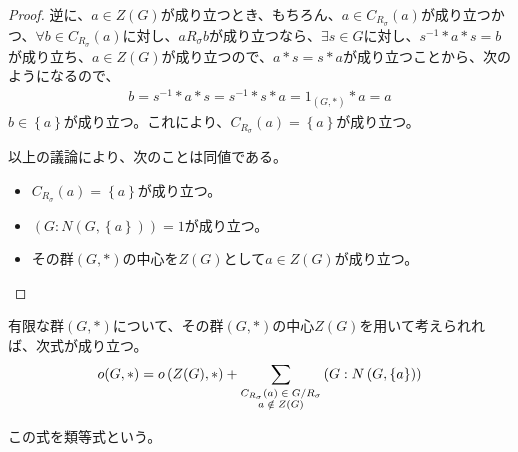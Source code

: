 \documentclass[dvipdfmx]{jsarticle}
\begin{document}
\begin{proof}
逆に、$a \in Z(G)$が成り立つとき、もちろん、$a \in C_{R_{\sigma}}(a)$が成り立つかつ、$\forall b \in C_{R_{\sigma}}(a)$に対し、$aR_{\sigma}b$が成り立つなら、$\exists s \in G$に対し、$s^{- 1}*a*s = b$が成り立ち、$a \in Z(G)$が成り立つので、$a*s = s*a$が成り立つことから、次のようになるので、
\begin{align*}
b = s^{- 1}*a*s = s^{- 1}*s*a = 1_{(G,*)}*a = a
\end{align*}
$b \in \left\{ a \right\}$が成り立つ。これにより、$C_{R_{\sigma}}(a) = \left\{ a \right\}$が成り立つ。\par
以上の議論により、次のことは同値である。
\begin{itemize}
\item
  $C_{R_{\sigma}}(a) = \left\{ a \right\}$が成り立つ。
\item
  $\left( G:N\left( G,\left\{ a \right\} \right) \right) = 1$が成り立つ。
\item
  その群$(G,*)$の中心を$Z(G)$として$a \in Z(G)$が成り立つ。
\end{itemize}
\end{proof}
\begin{thm}[類等式]\label{3.1.3.8}
有限な群$(G,*)$について、その群$(G,*)$の中心$Z(G)$を用いて考えられれば、次式が成り立つ。
\begin{align*}
o(G,*) = o\left( Z(G),* \right) + \sum_{\scriptsize \begin{matrix} C_{R_{\sigma}}(a) \in {G}/{R_{\sigma}} \\a \notin Z(G) \end{matrix}} \left( G:N\left( G,\left\{ a \right\} \right) \right)
\end{align*}\par
この式を類等式という。
\end{thm}
\end{document}
